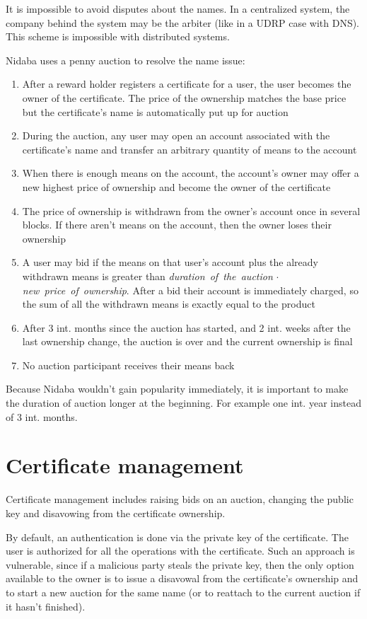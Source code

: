 \documentclass[12pt]{article}
\begin{document}
It is impossible to avoid disputes about the names. In a centralized system, the company behind the system may be the arbiter (like in a UDRP case with DNS). This scheme is impossible with distributed systems.

Nidaba uses a penny auction to resolve the name issue:
\begin{enumerate}
  \item After a reward holder registers a certificate for a user, the user becomes the owner of the certificate. The price of the ownership matches the base price but the certificate's name is automatically put up for auction
  \item During the auction, any user may open an account associated with the certificate's name and transfer an arbitrary quantity of means to the account
  \item When there is enough means on the account, the account's owner may offer a new highest price of ownership and become the owner of the certificate
  \item The price of ownership is withdrawn from the owner's account once in several blocks. If there aren't means on the account, then the owner loses their ownership
  \item A user may bid if the means on that user's account plus the already withdrawn means is greater than \textit{duration~of~the~auction} $\cdot$ \textit{new~price~of~ownership}. After a bid their account is immediately charged, so the sum of all the withdrawn means is exactly equal to the product
  \item After 3 int. months since the auction has started, and 2 int. weeks after the last ownership change, the auction is over and the current ownership is final
  \item No auction participant receives their means back
\end{enumerate}

Because Nidaba wouldn't gain popularity immediately, it is important to make the duration of auction longer at the beginning. For example one int. year instead of 3 int. months.

\section{Certificate management}

Certificate management includes raising bids on an auction, changing the public key and disavowing from the certificate ownership.

By default, an authentication is done via the private key of the certificate. The user is authorized for all the operations with the certificate. Such an approach is vulnerable, since if a malicious party steals the private key, then the only option available to the owner is to issue a disavowal from the certificate's ownership and to start a new auction for the same name (or to reattach to the current auction if it hasn't finished).
\end{document}
